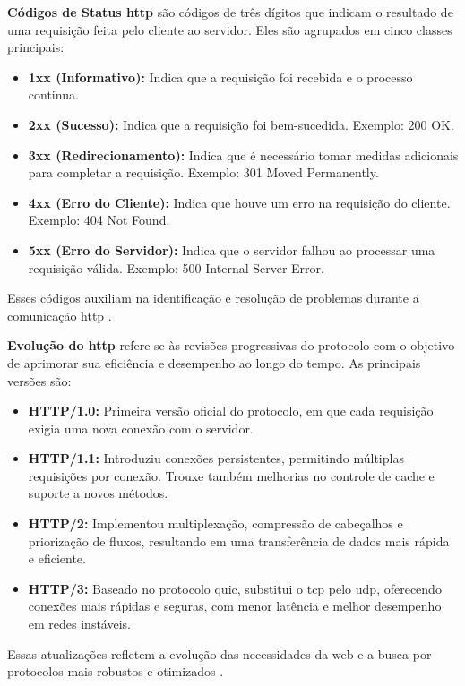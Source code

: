 \textbf{Códigos de Status \acrshort{http}} são códigos de três dígitos que indicam o resultado de uma requisição feita pelo cliente ao servidor. Eles são agrupados em cinco classes principais:

\begin{itemize}
    \item \textbf{1xx (Informativo):} Indica que a requisição foi recebida e o processo continua.
    \item \textbf{2xx (Sucesso):} Indica que a requisição foi bem-sucedida. Exemplo: 200 OK.
    \item \textbf{3xx (Redirecionamento):} Indica que é necessário tomar medidas adicionais para completar a requisição. Exemplo: 301 Moved Permanently.
    \item \textbf{4xx (Erro do Cliente):} Indica que houve um erro na requisição do cliente. Exemplo: 404 Not Found.
    \item \textbf{5xx (Erro do Servidor):} Indica que o servidor falhou ao processar uma requisição válida. Exemplo: 500 Internal Server Error.
\end{itemize}

Esses códigos auxiliam na identificação e resolução de problemas durante a comunicação \acrshort{http} \cite{mdn_http}.


\textbf{Evolução do \acrshort{http}} refere-se às revisões progressivas do protocolo com o objetivo de aprimorar sua eficiência e desempenho ao longo do tempo. As principais versões são:

\begin{itemize}
    \item \textbf{HTTP/1.0:} Primeira versão oficial do protocolo, em que cada requisição exigia uma nova conexão com o servidor.
    \item \textbf{HTTP/1.1:} Introduziu conexões persistentes, permitindo múltiplas requisições por conexão. Trouxe também melhorias no controle de cache e suporte a novos métodos.
    \item \textbf{HTTP/2:} Implementou multiplexação, compressão de cabeçalhos e priorização de fluxos, resultando em uma transferência de dados mais rápida e eficiente.
    \item \textbf{HTTP/3:} Baseado no protocolo \acrshort{quic}, substitui o \acrshort{tcp} pelo \acrshort{udp}, oferecendo conexões mais rápidas e seguras, com menor latência e melhor desempenho em redes instáveis.
\end{itemize}

Essas atualizações refletem a evolução das necessidades da web e a busca por protocolos mais robustos e otimizados \cite{cloudflare_http}.

